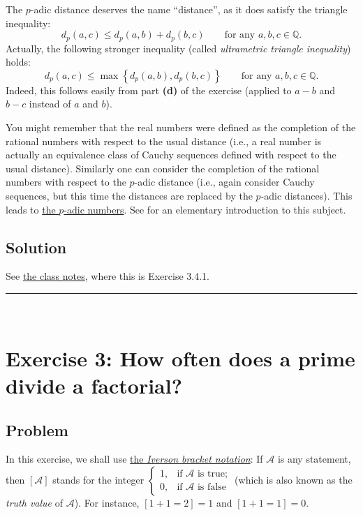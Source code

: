 \documentclass[paper=a4, fontsize=12pt]{scrartcl} %
\newcommand{\QQ}{\mathbb{Q}} %
\newcommand{\set}[1]{\left\{ #1 \right\}}
\newcommand{\tup}[1]{\left( #1 \right)}
\newcommand{\ive}[1]{\left[ #1 \right]}
\newcommand{\horrule}[1]{\rule{\linewidth}{#1}} %
\theoremstyle{plainsl}
\theoremstyle{definition}
\theoremstyle{remark}
\begin{document}
The $p$-adic distance deserves the name ``distance'', as it
does satisfy the triangle inequality:
\[
d_p\tup{a, c} \leq d_p\tup{a, b} + d_p\tup{b, c}
\qquad \text{for any $a, b, c \in \QQ$} .
\]
Actually, the following stronger inequality (called
\textit{ultrametric triangle inequality}) holds:
\[
d_p\tup{a, c} \leq \max\set{d_p\tup{a, b}, d_p\tup{b, c}}
\qquad \text{for any $a, b, c \in \QQ$} .
\]
Indeed, this follows easily from part \textbf{(d)} of the
exercise (applied to $a-b$ and $b-c$ instead of $a$ and $b$).

You might remember that the real numbers were defined as the
completion of the rational numbers with respect to the usual
distance (i.e., a real number is actually an equivalence class
of Cauchy sequences defined with respect to the usual distance).
Similarly one can consider the completion of the rational numbers
with respect to the $p$-adic distance (i.e., again consider
Cauchy sequences, but this time the distances are replaced by
the $p$-adic distances).
This leads to \href{https://en.wikipedia.org/wiki/P-adic_number}{the $p$-adic numbers}.
See \cite{Gouvea97} for an elementary introduction to this
subject.

\subsection{Solution}

See
\href{http://www-users.math.umn.edu/~dgrinber/19s/notes.pdf}{the class notes},
where this is Exercise 3.4.1.

\horrule{0.3pt} \\[0.4cm]

\section{Exercise 3: How often does a prime divide a factorial?}

\subsection{Problem}

In this exercise, we shall use
\href{https://en.wikipedia.org/wiki/Iverson_bracket}{the \textit{Iverson bracket notation}}:
If $\mathcal{A}$ is any statement, then $\ive{\mathcal{A}}$
stands for the integer
$\begin{cases}
1, & \text{if $\mathcal{A}$ is true;} \\
0, & \text{if $\mathcal{A}$ is false}
\end{cases}$
(which is also known as the \textit{truth value} of
$\mathcal{A}$).
For instance, $\ive{1+1 = 2} = 1$ and $\ive{1+1 = 1} = 0$.
\end{document}
